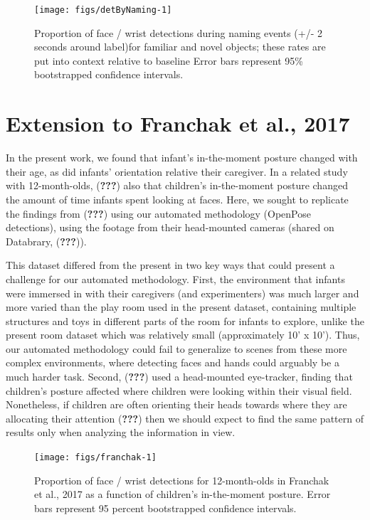 \documentclass[english,man,floatsintext,draftall]{apa6}
\begin{document}
\begin{figure}[h]

{\centering \texttt{[image: figs/detByNaming-1]} 

}

\caption{Proportion of face / wrist detections during naming events (+/- 2 seconds around label)for familiar and novel objects; these rates are put into context relative to baseline Error bars represent 95\% bootstrapped confidence intervals.}\label{fig:detByNaming}
\end{figure}

\section{Extension to Franchak et al.,
2017}\label{extension-to-franchak-et-al.-2017}

In the present work, we found that infant's in-the-moment posture
changed with their age, as did infants' orientation relative their
caregiver. In a related study with 12-month-olds, ({\textbf{???}}) also
that children's in-the-moment posture changed the amount of time infants
spent looking at faces. Here, we sought to replicate the findings from
({\textbf{???}}) using our automated methodology (OpenPose detections),
using the footage from their head-mounted cameras (shared on Databrary,
({\textbf{???}})).

This dataset differed from the present in two key ways that could
present a challenge for our automated methodology. First, the
environment that infants were immersed in with their caregivers (and
experimenters) was much larger and more varied than the play room used
in the present dataset, containing multiple structures and toys in
different parts of the room for infants to explore, unlike the present
room dataset which was relatively small (approximately 10' x 10'). Thus,
our automated methodology could fail to generalize to scenes from these
more complex environments, where detecting faces and hands could
arguably be a much harder task. Second, ({\textbf{???}}) used a
head-mounted eye-tracker, finding that children's posture affected where
children were looking within their visual field. Nonetheless, if
children are often orienting their heads towards where they are
allocating their attention ({\textbf{???}}) then we should expect to
find the same pattern of results only when analyzing the information in
view.

\begin{figure}[h]

{\centering \texttt{[image: figs/franchak-1]} 

}

\caption{Proportion of face / wrist detections for 12-month-olds in Franchak et al., 2017 as a function of children's in-the-moment posture. Error bars represent 95 percent bootstrapped confidence intervals.}\label{fig:franchak}
\end{figure}
\end{document}
